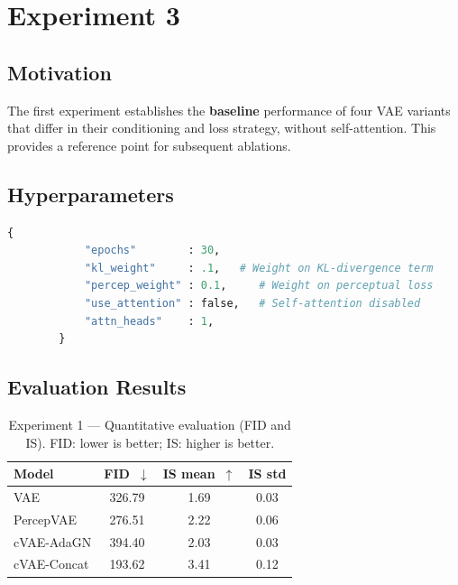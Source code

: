 \documentclass[12pt, a4paper]{article}
\begin{document}
\section{Experiment 3}
\label{sec:exp1}

\subsection{Motivation}
\label{subsec:exp1-motivation}

The first experiment establishes the \textbf{baseline} performance of
four VAE variants that differ in their conditioning and loss strategy,
without self-attention. This provides a reference point for subsequent
ablations.

\subsection{Hyperparameters}
\label{subsec:exp1-hp}

\begin{configbox}
	\begin{lstlisting}[language=Python, numbers=none]
		{
			"epochs"        : 30,
			"kl_weight"     : .1,   # Weight on KL-divergence term
			"percep_weight" : 0.1,     # Weight on perceptual loss
			"use_attention" : false,   # Self-attention disabled
			"attn_heads"    : 1,
		}
	\end{lstlisting}
\end{configbox}



\subsection{Evaluation Results}
\label{subsec:exp1-results}

\begin{table}[H]
	\centering
	\caption{Experiment 1 — Quantitative evaluation (FID and IS).
		FID: lower is better; IS: higher is better.}
	\label{tab:exp1-metrics}
	\begin{tabular}{lccc}
		\toprule
		\textbf{Model} & \textbf{FID}~$\downarrow$
		& \textbf{IS mean}~$\uparrow$
		& \textbf{IS std} \\
		\midrule
		VAE            & 326.79 & 1.69 & 0.03 \\
		PercepVAE      & 276.51 & 2.22 & 0.06 \\
		cVAE-AdaGN     & 394.40 & 2.03 & 0.03 \\
		cVAE-Concat    & 193.62 & 3.41 & 0.12 \\
		\bottomrule
	\end{tabular}
\end{table}
\end{document}

